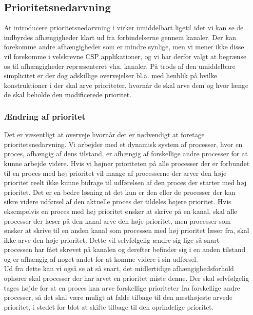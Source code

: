 \subsection{Prioritetsnedarvning}
At introducere prioritetsnedarvning i \pycsp virker umiddelbart ligetil idet vi kan se de indbyrdes afhængigheder klart ud fra forbindelserne gennem kanaler. Der kan forekomme andre afhængigheder som er mindre synlige, men vi mener ikke disse vil forekomme i velskrevne CSP applikationer, og vi har derfor valgt at begrænse os til afhængigheder repræsenteret vha. kanaler. På trods af den umiddelbare simplicitet er der dog adskillige overvejelser bl.a. med henblik på hvilke konstruktioner i \pycsp der skal arve prioriteter, hvornår de skal arve dem og hvor længe de skal beholde den modificerede prioritet. \\

\subsubsection*{Ændring af prioritet}
Det er væsentligt at overveje hvornår det er nødvendigt at foretage prioritetsnedarvning. Vi arbejder med et dynamisk system af processer, hvor en proces, afhængig af dens tilstand, er afhængig af forskellige andre processer for at kunne arbejde videre. Hvis vi højner prioriteten på alle processer der er forbundet til en proces med høj prioritet vil mange af processerne der arver den høje prioritet reelt ikke kunne bidrage til udførelsen af den proces der starter med høj prioritet. Det er en bedre løsning at det kun er den eller de processer der kan sikre videre udførsel af den aktuelle proces der tildeles højere prioritet. Hvis eksempelvis en proces med høj prioritet ønsker at skrive på en kanal, skal alle processer der læser på den kanal arve den høje prioritet, men processer som ønsker at skrive til en anden kanal som processen med høj prioritet læser fra, skal ikke arve den høje prioritet. Dette vil selvfølgelig ændre sig lige så snart processen har fået skrevet på kanalen og derefter befinder sig i en anden tilstand og er afhængig af noget andet for at komme videre i sin udførsel. \\
Ud fra dette kan vi også se at så snart, det midlertidige afhængighedsforhold ophører skal processer der har arvet en prioritet miste denne. Der skal selvfølgelig tages højde for at en proces kan arve forskellige prioriteter fra forskellige andre processer, så det skal være muligt at falde tilbage til den næsthøjeste arvede prioritet, i stedet for blot at skifte tilbage til den oprindelige prioritet. 

